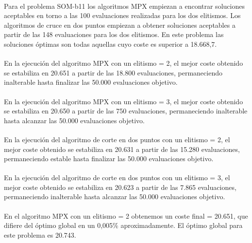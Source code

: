 	\paragraph{}Para el problema SOM-b11 los algoritmos MPX empiezan a encontrar soluciones aceptables en torno a las 100 evaluaciones realizadas para los dos elitismos. Los algoritmos de cruce en dos puntos empiezan a obtener soluciones aceptables a partir de las 148 evaluaciones para los dos elitismos. En este problema las soluciones óptimas son todas aquellas cuyo coste es superior a 18.668,7.
	
	\paragraph{}En la ejecución del algoritmo MPX con un elitismo = 2, el mejor coste obtenido se estabiliza en 20.651 a partir de las 18.800 evaluaciones, permaneciendo inalterable hasta finalizar las 50.000 evaluaciones objetivo.
	
	\paragraph{}En la ejecución del algoritmo MPX con un elitismo = 3, el mejor coste obtenido se estabiliza en 20.650 a partir de las 750 evaluaciones, permaneciendo inalterable hasta alcanzar las 50.000 evaluaciones objetivo.
	
	\paragraph{}En la ejecución del algoritmo de corte en dos puntos con un elitismo = 2, el mejor coste obtenido se estabiliza en 20.631 a partir de las 15.280 evaluaciones, permaneciendo estable hasta finalizar las 50.000 evaluaciones objetivo.
	
	\paragraph{}En la ejecución del algoritmo de corte en dos puntos con un elitismo = 3, el mejor coste obtenido se estabiliza en 20.623 a partir de las 7.865 evaluaciones, permaneciendo inalterable hasta alcanzar las 50.000 evaluaciones objetivo.
	
	\paragraph{}En el algoritmo MPX con un elitismo = 2 obtenemos un coste final = 20.651, que difiere del óptimo global en un 0,005\% aproximadamente. El óptimo global para este problema es 20.743.
	
